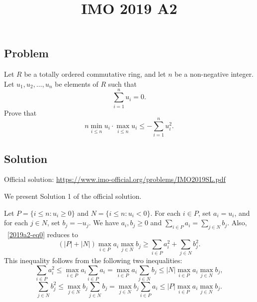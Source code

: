 \documentclass{article}
\title{IMO 2019 A2}
\author{}
\date{}
\begin{document}
\maketitle



\subsection*{Problem}

Let $R$ be a totally ordered commutative ring, and let $n$ be a non-negative integer.
Let $u_1, u_2, \ldots, u_n$ be elements of $R$ such that
\[ \sum_{i = 1}^n u_i = 0. \]
Prove that
\[ n \min_{i \leq n} u_i \cdot \max_{i \leq n} u_i \leq -\sum_{i = 1}^n u_i^2. \tag{*}\label{2019a2-eq0} \]



\subsection*{Solution}

Official solution: \url{https://www.imo-official.org/problems/IMO2019SL.pdf}

We present Solution 1 of the official solution.

Let $P = \{i \leq n : u_i \geq 0\}$ and $N = \{i \leq n : u_i < 0\}$.
For each $i \in P$, set $a_i = u_i$, and for each $j \in N$, set $b_j = -u_j$.
We have $a_i, b_j \geq 0$ and $\displaystyle \sum_{i \in P} a_i = \sum_{j \in N} b_j$.
Also, ~\eqref{2019a2-eq0} reduces to
\[ (|P| + |N|) \max_{i \in P} a_i \max_{j \in N} b_j \geq \sum_{i \in P} a_i^2 + \sum_{j \in N} b_j^2. \]
This inequality follows from the following two inequalities:
\[ \sum_{i \in P} a_i^2 \leq \max_{i \in P} a_i \sum_{i \in P} a_i = \max_{i \in P} a_i \sum_{j \in N} b_j \leq |N| \max_{i \in P} a_i \max_{j \in N} b_j, \]
\[ \sum_{j \in N} b_j^2 \leq \max_{j \in N} b_j \sum_{j \in N} b_j = \max_{j \in N} b_j \sum_{i \in P} a_i \leq |P| \max_{i \in P} a_i \max_{j \in N} b_j. \]
\end{document}
